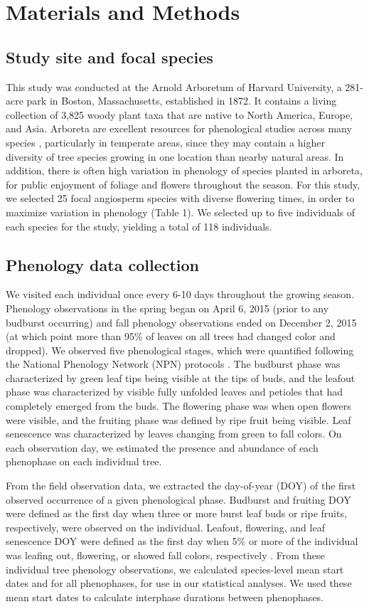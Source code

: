 \documentclass{article}
\begin{document}
\section* {Materials and Methods}
\subsection*{Study site and focal species}
This study was conducted at the Arnold Arboretum of Harvard University, a 281-acre park in Boston, Massachusetts, established in 1872. It contains a living collection of 3,825 woody plant taxa that are native to North America, Europe, and Asia. Arboreta are excellent resources for phenological studies across many species \citep [e.g., ][]{primack2009a}, particularly in temperate areas, since they may contain a higher diversity of tree species growing in one location than nearby natural areas. In addition, there is often high variation in phenology of species planted in arboreta, for public enjoyment of foliage and flowers throughout the season. For this study, we selected 25 focal angiosperm species with diverse flowering times, in order to maximize variation in phenology (Table 1). We selected up to five individuals of each species for the study, yielding a total of 118 individuals.

\subsection*{Phenology data collection}
We visited each individual once every 6-10 days throughout the growing season. Phenology observations in the spring began on April 6, 2015 (prior to any budburst occurring) and fall phenology observations ended on December 2, 2015 (at which point more than 95\% of leaves on all trees had changed color and dropped). We observed five phenological stages, which were quantified following the National Phenology Network (NPN) protocols \citep[for a full description see][]{denny2014}. The budburst phase was characterized by green leaf tips being visible at the tips of buds, and the leafout phase was characterized by visible fully unfolded leaves and petioles that had completely emerged from the buds. The flowering phase was when open flowers were visible, and the fruiting phase was defined by ripe fruit being visible. Leaf senescence was characterized by leaves changing from green to fall colors. On each observation day, we estimated the presence and abundance of each phenophase on each individual tree.
\par From the field observation data, we extracted the day-of-year (DOY) of the first observed occurrence of a given phenological phase. Budburst and fruiting DOY were defined as the first day when three or more burst leaf buds or ripe fruits, respectively, were observed on the individual. Leafout, flowering, and leaf senescence DOY were defined as the first day when 5\% or more of the individual was leafing out, flowering, or showed fall colors, respectively \citep{denny2014}. 
From these individual tree phenology observations, we calculated species-level mean start dates and for all phenophases, for use in our statistical analyses. We used these mean start dates to calculate interphase durations between phenophases. 
\end{document}
